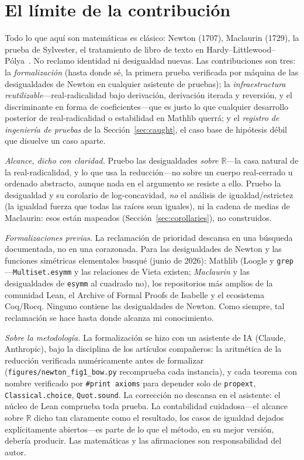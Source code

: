 \documentclass[11pt]{article}
\newcommand{\lean}[1]{\texttt{#1}}
\newcommand{\R}{\mathbb{R}}
\begin{document}
\section{El l\'imite de la contribuci\'on}\label{sec:boundary}

Todo lo que aqu\'i son matem\'aticas es cl\'asico: Newton (1707), Maclaurin (1729), la prueba de
Sylvester, el tratamiento de libro de texto en Hardy--Littlewood--P\'olya~\cite{HLP}. No reclamo
identidad ni desigualdad nuevas. Las contribuciones son tres: la \emph{formalizaci\'on} (hasta donde
s\'e, la primera prueba verificada por m\'aquina de las desigualdades de Newton en cualquier
asistente de pruebas); la \emph{infraestructura reutilizable}---real-radicalidad bajo derivaci\'on,
derivaci\'on iterada y reversi\'on, y el discriminante en forma de coeficientes---que es justo lo que
cualquier desarrollo posterior de real-radicalidad o estabilidad en Mathlib querr\'a; y el
\emph{registro de ingenier\'ia de pruebas} de la Secci\'on~\ref{sec:caught}, el caso base de
hip\'otesis d\'ebil que disuelve un caso aparte.

\emph{Alcance, dicho con claridad.} Pruebo las desigualdades \emph{sobre $\R$}---la casa natural de
la real-radicalidad, y lo que usa la reducci\'on---no sobre un cuerpo real-cerrado u ordenado
abstracto, aunque nada en el argumento se resiste a ello. Pruebo la desigualdad y su corolario de
log-concavidad, \emph{no} el an\'alisis de igualdad/estrictez (la igualdad fuerza que todas las
ra\'ices sean iguales), ni la cadena de medias de Maclaurin: esos est\'an mapeados
(Secci\'on~\ref{sec:corollaries}), no construidos.

\emph{Formalizaciones previas.} La reclamaci\'on de prioridad descansa en una b\'usqueda
documentada, no en una corazonada. Para las desigualdades de Newton y las funciones sim\'etricas
elementales busqu\'e (junio de 2026): Mathlib (Loogle y \lean{grep}---\lean{Multiset.esymm} y las
relaciones de Vieta existen; \emph{Maclaurin} y las desigualdades de \lean{esymm} al cuadrado no),
los repositorios m\'as amplios de la comunidad Lean, el Archive of Formal Proofs de Isabelle y el
ecosistema Coq/Rocq. Ninguno contiene las desigualdades de Newton. Como siempre, tal reclamaci\'on
se hace hasta donde alcanza mi conocimiento.

\emph{Sobre la metodolog\'ia.} La formalizaci\'on se hizo con un asistente de IA (Claude, Anthropic),
bajo la disciplina de los art\'iculos compa\~neros: la aritm\'etica de la reducci\'on verificada
num\'ericamente antes de formalizar (\lean{figures/newton\_fig1\_bow.py} recomprueba cada instancia),
y cada teorema con nombre verificado por \lean{\#print axioms} para depender solo de \lean{propext},
\lean{Classical.choice}, \lean{Quot.sound}. La correcci\'on no descansa en el asistente: el n\'ucleo
de Lean comprueba toda prueba. La contabilidad cuidadosa---el alcance sobre $\R$ dicho tan
claramente como el resultado, los casos de igualdad dejados expl\'icitamente abiertos---es parte de
lo que el m\'etodo, en su mejor versi\'on, deber\'ia producir. Las matem\'aticas y las afirmaciones
son responsabilidad del autor.
\end{document}
